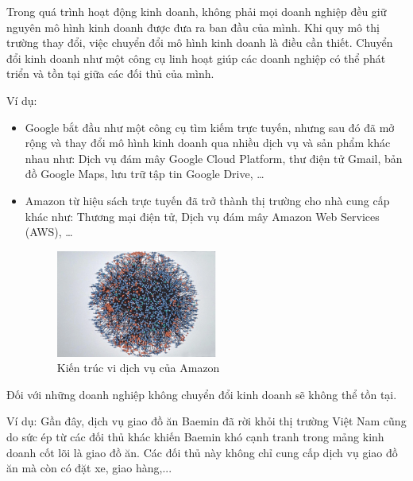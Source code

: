 Trong quá trình hoạt động kinh doanh, không phải mọi doanh nghiệp đều giữ nguyên mô hình kinh doanh được đưa ra ban đầu của mình. Khi quy mô thị trường thay đổi, việc chuyển đổi mô hình kinh doanh là điều cần thiết. Chuyển đổi kinh doanh như một công cụ linh hoạt giúp các doanh nghiệp có thể phát triển và tồn tại giữa các đối thủ của mình.

Ví dụ:

\begin{itemize}

\item Google bắt đầu như một công cụ tìm kiếm trực tuyến, nhưng sau đó đã mở rộng và thay đổi mô hình kinh doanh qua nhiều dịch vụ và sản phẩm khác nhau như: Dịch vụ đám mây Google Cloud Platform, thư điện tử Gmail, bản đồ Google Maps, lưu trữ tập tin Google Drive, \dots

\item Amazon từ hiệu sách trực tuyến đã trở thành thị trường cho nhà cung cấp khác như: Thương mại điện tử, Dịch vụ đám mây Amazon Web Services (AWS), \dots

\begin{figure}[H]

\centering

\includegraphics[width = 0.5\textwidth]{pictures/KienTrucViDichVuAmazon/main.png}

\caption{Kiến trúc vi dịch vụ của Amazon}

\end{figure}

\end{itemize}

Đối với những doanh nghiệp không chuyển đổi kinh doanh sẽ không thể tồn tại.

Ví dụ: Gần đây, dịch vụ giao đồ ăn Baemin đã rời khỏi thị trường Việt Nam cũng do sức ép từ các đối thủ khác khiến Baemin khó cạnh tranh trong mảng kinh doanh cốt lõi là giao đồ ăn. Các đối thủ này không chỉ cung cấp dịch vụ giao đồ ăn mà còn có đặt xe, giao hàng,...

